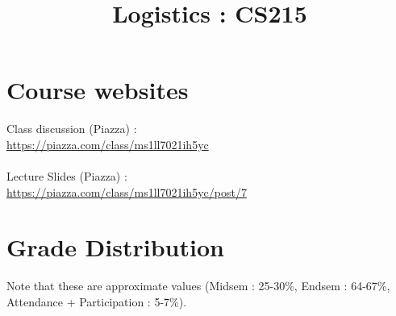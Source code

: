 \documentclass{article}
\title{Logistics : CS215}
\date{}
\begin{document}
\maketitle

\section{Course websites}
Class discussion (Piazza) : \\\url{https://piazza.com/class/ms1ll7021ih5yc}
\\\\Lecture Slides (Piazza) : \\\url{https://piazza.com/class/ms1ll7021ih5yc/post/7}

\section{Grade Distribution}
Note that these are approximate values (Midsem : 25-30\%, Endsem : 64-67\%, Attendance + Participation : 5-7\%).\\\\
\end{document}
